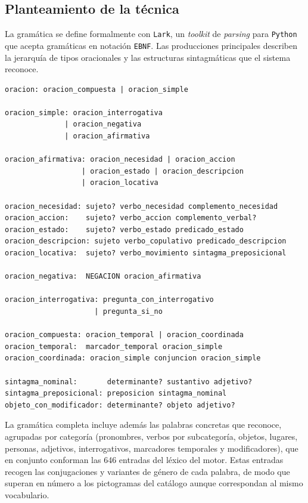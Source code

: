 \subsection{Planteamiento de la técnica}
\label{sec:f1-planteamiento}

La gramática se define formalmente con \texttt{Lark}, un \textit{toolkit} de \textit{parsing} para \texttt{Python} que acepta gramáticas en notación \texttt{EBNF}. Las producciones principales describen la jerarquía de tipos oracionales y las estructuras sintagmáticas que el sistema reconoce.

\begin{lstlisting}[caption={Producciones principales de la gramática CFG (notación EBNF/Lark).},label={lst:cfg-producciones},basicstyle=\ttfamily\small,xleftmargin=1cm]
oracion: oracion_compuesta | oracion_simple

oracion_simple: oracion_interrogativa
              | oracion_negativa
              | oracion_afirmativa

oracion_afirmativa: oracion_necesidad | oracion_accion
                  | oracion_estado | oracion_descripcion
                  | oracion_locativa

oracion_necesidad: sujeto? verbo_necesidad complemento_necesidad
oracion_accion:    sujeto? verbo_accion complemento_verbal?
oracion_estado:    sujeto? verbo_estado predicado_estado
oracion_descripcion: sujeto verbo_copulativo predicado_descripcion
oracion_locativa:  sujeto? verbo_movimiento sintagma_preposicional

oracion_negativa:  NEGACION oracion_afirmativa

oracion_interrogativa: pregunta_con_interrogativo
                     | pregunta_si_no

oracion_compuesta: oracion_temporal | oracion_coordinada
oracion_temporal:  marcador_temporal oracion_simple
oracion_coordinada: oracion_simple conjuncion oracion_simple

sintagma_nominal:       determinante? sustantivo adjetivo?
sintagma_preposicional: preposicion sintagma_nominal
objeto_con_modificador: determinante? objeto adjetivo?
\end{lstlisting}

La gramática completa incluye además las palabras concretas que reconoce, agrupadas por categoría (pronombres, verbos por subcategoría, objetos, lugares, personas, adjetivos, interrogativos, marcadores temporales y modificadores), que en conjunto conforman las 646 entradas del léxico del motor. Estas entradas recogen las conjugaciones y variantes de género de cada palabra, de modo que superan en número a los pictogramas del catálogo aunque correspondan al mismo vocabulario.

